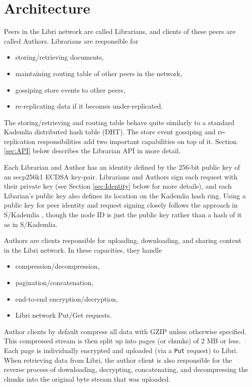 \documentclass[10pt]{article}
\newcommand{\ttt}[1]{\texttt{#1}}
\def\Put{\ttt{Put}}
\begin{document}
\section{Architecture}
\label{sec:arch}
Peers in the Libri network are called Librarians, and clients of these peers are called Authors. Librarians are responsible for 
\begin{itemize}
	\item storing/retrieving documents,
	\item maintaining routing table of other peers in the network,
	\item gossiping store events to other peers,
	\item re-replicating data if it becomes under-replicated.
\end{itemize}
The storing/retrieving and routing table behave quite similarly to a standard Kademlia \cite{kademlia} distributed hash table (DHT). The store event gossiping and re-replication responsibilities add two important capabilities on top of it. Section \ref{sec:API} below describes the Librarian API in more detail.

Each Librarian and Author has an identity defined by the 256-bit public key of an secp256k1 ECDSA key-pair. Librarians and Authors sign each request with their private key (see Section \ref{sec:Identity} below for more details), and each Libarian's public key also defines its location on the Kademlia hash ring. Using a public key for peer identity and request signing closely follows the approach in S/Kademlia \cite{skademlia}, though the node ID is just the public key rather than a hash of it as in S/Kademlia. 

Authors are clients responsible for uploading, downloading, and sharing content in the Libri network. In these capacities, they handle
\begin{itemize}
	\item compression/decompression,
	\item pagination/concatenation,
	\item end-to-end encryption/decryption,
	\item Libri network Put/Get requests.
\end{itemize}

Author clients by default compress all data with GZIP unless otherwise specified. This compressed stream is then split up into pages (or chunks) of 2 MB or less. Each page is individually encrypted and uploaded (via a \Put{} request) to Libri. When retrieving data from Libri, the author client is also responsible for the reverse process of downloading, decrypting, concatenating, and decompressing the chunks into the original byte stream that was uploaded.
\end{document}
